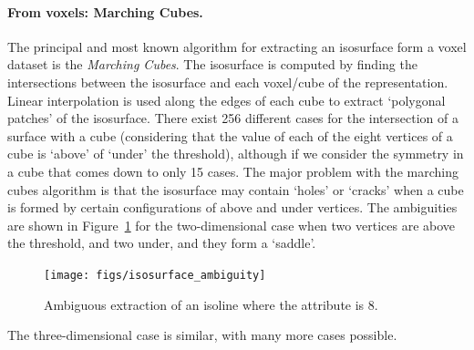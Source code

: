 \paragraph{From voxels: Marching Cubes.} 
The principal and most known algorithm for extracting an isosurface form a voxel dataset is the \emph{Marching Cu\-bes}. 
The isosurface is computed by finding the intersections between the isosurface and each voxel/cube of the representation. 
Linear interpolation is used along the edges of each cube to extract `polygonal patches' of the isosurface. 
There exist 256 different cases for the intersection of a surface with a cube (considering that the value of each of the eight vertices of a cube is `above' of `under' the threshold), although if we consider the symmetry in a cube that comes down to only 15 cases. 
The major problem with the marching cubes algorithm is that the isosurface may contain `holes' or `cracks' when a cube is formed by certain configurations of above and under vertices. 
The ambiguities are shown in Figure~\ref{fig:isosurface_ambiguity} for the two-dimensional case when two vertices are above the threshold, and two under, and they form a `saddle'.
\begin{figure}
  \centering
  \texttt{[image: figs/isosurface\_ambiguity]}
  \caption{Ambiguous extraction of an isoline where the attribute is 8.}%
\label{fig:isosurface_ambiguity}
\end{figure}
The three-dimensional case is similar, with many more cases possible. 

%

